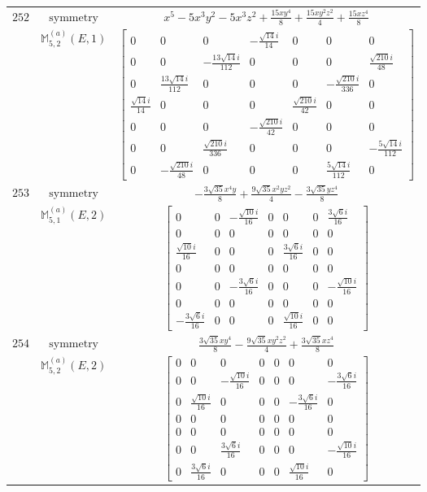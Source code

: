 \documentclass[fleqn,8pt,landscape]{jsarticle}
\begin{document}
\begin{longtable}{ccc}
$ 252 $ & $ \text{symmetry} $ & $ x^{5} - 5 x^{3} y^{2} - 5 x^{3} z^{2} + \frac{15 x y^{4}}{8} + \frac{15 x y^{2} z^{2}}{4} + \frac{15 x z^{4}}{8} $ \\
$  $ & $ \mathbb{M}_{5,2}^{(a)}(E,1) $ & $ \begin{bmatrix} 0 & 0 & 0 & - \frac{\sqrt{14} i}{14} & 0 & 0 & 0 \\ 0 & 0 & - \frac{13 \sqrt{14} i}{112} & 0 & 0 & 0 & \frac{\sqrt{210} i}{48} \\ 0 & \frac{13 \sqrt{14} i}{112} & 0 & 0 & 0 & - \frac{\sqrt{210} i}{336} & 0 \\ \frac{\sqrt{14} i}{14} & 0 & 0 & 0 & \frac{\sqrt{210} i}{42} & 0 & 0 \\ 0 & 0 & 0 & - \frac{\sqrt{210} i}{42} & 0 & 0 & 0 \\ 0 & 0 & \frac{\sqrt{210} i}{336} & 0 & 0 & 0 & - \frac{5 \sqrt{14} i}{112} \\ 0 & - \frac{\sqrt{210} i}{48} & 0 & 0 & 0 & \frac{5 \sqrt{14} i}{112} & 0 \end{bmatrix} $ \\ \hline
$ 253 $ & $ \text{symmetry} $ & $ - \frac{3 \sqrt{35} x^{4} y}{8} + \frac{9 \sqrt{35} x^{2} y z^{2}}{4} - \frac{3 \sqrt{35} y z^{4}}{8} $ \\
$  $ & $ \mathbb{M}_{5,1}^{(a)}(E,2) $ & $ \begin{bmatrix} 0 & 0 & - \frac{\sqrt{10} i}{16} & 0 & 0 & 0 & \frac{3 \sqrt{6} i}{16} \\ 0 & 0 & 0 & 0 & 0 & 0 & 0 \\ \frac{\sqrt{10} i}{16} & 0 & 0 & 0 & \frac{3 \sqrt{6} i}{16} & 0 & 0 \\ 0 & 0 & 0 & 0 & 0 & 0 & 0 \\ 0 & 0 & - \frac{3 \sqrt{6} i}{16} & 0 & 0 & 0 & - \frac{\sqrt{10} i}{16} \\ 0 & 0 & 0 & 0 & 0 & 0 & 0 \\ - \frac{3 \sqrt{6} i}{16} & 0 & 0 & 0 & \frac{\sqrt{10} i}{16} & 0 & 0 \end{bmatrix} $ \\ \hline
$ 254 $ & $ \text{symmetry} $ & $ \frac{3 \sqrt{35} x y^{4}}{8} - \frac{9 \sqrt{35} x y^{2} z^{2}}{4} + \frac{3 \sqrt{35} x z^{4}}{8} $ \\
$  $ & $ \mathbb{M}_{5,2}^{(a)}(E,2) $ & $ \begin{bmatrix} 0 & 0 & 0 & 0 & 0 & 0 & 0 \\ 0 & 0 & - \frac{\sqrt{10} i}{16} & 0 & 0 & 0 & - \frac{3 \sqrt{6} i}{16} \\ 0 & \frac{\sqrt{10} i}{16} & 0 & 0 & 0 & - \frac{3 \sqrt{6} i}{16} & 0 \\ 0 & 0 & 0 & 0 & 0 & 0 & 0 \\ 0 & 0 & 0 & 0 & 0 & 0 & 0 \\ 0 & 0 & \frac{3 \sqrt{6} i}{16} & 0 & 0 & 0 & - \frac{\sqrt{10} i}{16} \\ 0 & \frac{3 \sqrt{6} i}{16} & 0 & 0 & 0 & \frac{\sqrt{10} i}{16} & 0 \end{bmatrix} $ \\ \hline

\end{longtable}
\end{document}
